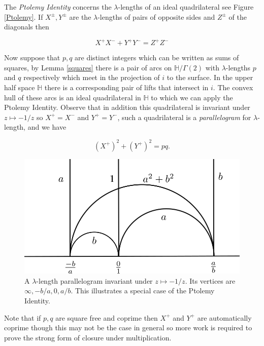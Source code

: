 \documentclass[12pt,a4paper]{amsart}
\def\HH{\mathbb{H}}
\def\xx{\HH/g2}
\def\g2{\Gamma(2)}
\def\xx{\HH/\g2}
\begin{document}
The \textit{Ptolemy Identity} concerns the $\lambda$-lengths of an
ideal quadrilateral see Figure \ref{Ptolemy}. If $X^\pm, Y^\pm$ are
the  $\lambda$-lengths of pairs of  opposite sides and $Z^\pm$ of
the diagonals then

\begin{equation}
	X^+ X^-
	+ Y^+ Y^- = Z^+ Z^-
\end{equation}

Now suppose that $p,q$ are distinct integers which can be written as
sums of squares, by Lemma \ref{squares} there is a pair of arcs on
$\xx$ with $\lambda$-lengths $p$ and $q$ respectively which meet in
the projection of $i$ to the surface. In the upper half space $\HH$
there is a corresponding pair of lifts that intersect in $i$. The
convex hull of these arcs is an ideal quadrilateral in $\HH$ to
which we can apply the Ptolemy Identity. Observe that in addition
this quadrilateral is invariant under $z \mapsto -1/z$ so $X^+ =
X^-$ and $Y^+ = Y^-$, such a quadrilateral is a
\textit{parallelogram} for $\lambda$-length, and we have

\begin{equation}
	(X^+)^2 + (Y^+)^2 = pq.
\end{equation}

\begin{figure}[ht]
\begin{center}
	\includegraphics[scale=.5]{./p2_quad.svg.png}
\end{center}
\caption{A $\lambda$-length parallelogram 
invariant under $z\mapsto -1/z$. Its vertices are $\infty, -b/a, 0,
a/b$. This illustrates a special case of the Ptolemy Identity.}
\label{pythagoras}
\end{figure}

Note that if $p,q$ are square free and coprime then $X^+$ and
$Y^+$ are automatically coprime though this may not be the case in
general so more work is required to prove the strong form of closure
under multiplication.
\end{document}
